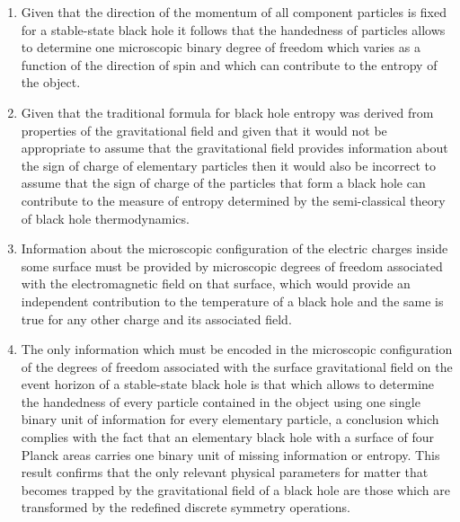 \documentclass[notitlepage,12pt]{report}
\begin{document}
\begin{enumerate}
\item Given that the direction of the momentum of all component particles is fixed for a stable-state black hole it follows that the handedness of particles allows to determine one microscopic binary degree of freedom which varies as a function of the direction of spin and which can contribute to the entropy of the object.

\item Given that the traditional formula for black hole entropy was derived from properties of the gravitational field and given that it would not be appropriate to assume that the gravitational field provides information about the sign of charge of elementary particles then it would also be incorrect to assume that the sign of charge of the particles that form a black hole can contribute to the measure of entropy determined by the semi-classical theory of black hole thermodynamics.

\item Information about the microscopic configuration of the electric charges inside some surface must be provided by microscopic degrees of freedom associated with the electromagnetic field on that surface, which would provide an independent contribution to the temperature of a black hole and the same is true for any other charge and its associated field.

\item The only information which must be encoded in the microscopic configuration of the degrees of freedom associated with the surface gravitational field on the event horizon of a stable-state black hole is that which allows to determine the handedness of every particle contained in the object using one single binary unit of information for every elementary particle, a conclusion which complies with the fact that an elementary black hole with a surface of four Planck areas carries one binary unit of missing information or entropy. This result confirms that the only relevant physical parameters for matter that becomes trapped by the gravitational field of a black hole are those which are transformed by the redefined discrete symmetry operations.


\end{enumerate}
\end{document}
